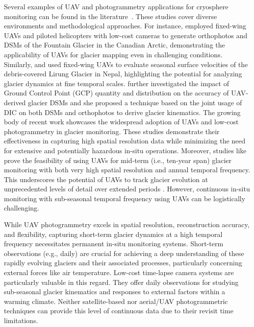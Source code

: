 Several examples of UAV and photogrammetry applications for cryosphere monitoring can be found in the literature~\citep{Bhardwaj2016, Gaffey2020}.
These studies cover diverse environments and methodological approaches.
For instance, \citet{Whitehead2013} employed fixed-wing UAVs and piloted helicopters with low-cost cameras to generate orthophotos and DSMs of the Fountain Glacier in the Canadian Arctic, demonstrating the applicability of UAVs for glacier mapping even in challenging conditions. 
Similarly, \citet{immerzeel2014} and \citet{kraaijenbrink2016} used fixed-wing UAVs to evaluate seasonal surface velocities of the debris-covered Lirung Glacier in Nepal, highlighting the potential for analyzing glacier dynamics at fine temporal scales.
\citet{Gindraux2017} further investigated the impact of Ground Control Point (GCP) quantity and distribution on the accuracy of UAV-derived glacier DSMs and she proposed a technique based on the joint usage of DIC on both DSMs and orthophotos to derive glacier kinematics.
The growing body of recent work \citep{Benoit2019, Chudley2019, Jouvet2020, Cao2021, Lamsters2022, belloni2023} showcases the widespread adoption of UAVs and low-cost photogrammetry in glacier monitoring. 
These studies demonstrate their effectiveness in capturing high spatial resolution data while minimizing the need for extensive and potentially hazardous in-situ operations. Moreover, studies like \citet{ioli2021mid} prove the feasibility of using UAVs for mid-term (i.e., ten-year span) glacier monitoring with both very high spatial resolution and annual temporal frequency. 
This underscores the potential of UAVs to track glacier evolution at unprecedented levels of detail over extended periods \citep{ioli2021mid, belloni2023}.
However, continuous in-situ monitoring with sub-seasonal temporal frequency using UAVs can be logistically challenging.

While UAV photogrammetry excels in spatial resolution, reconstruction accuracy, and flexibility, capturing short-term glacier dynamics at a high temporal frequency necessitates permanent in-situ monitoring systems. 
Short-term observations (e.g., daily) are crucial for achieving a deep understanding of these rapidly evolving glaciers and their associated processes, particularly concerning external forces like air temperature. 
Low-cost time-lapse camera systems are particularly valuable in this regard. 
They offer daily observations for studying sub-seasonal glacier kinematics and responses to external factors within a warming climate.  
Neither satellite-based nor aerial/UAV photogrammetric techniques can provide this level of continuous data due to their revisit time limitations.


